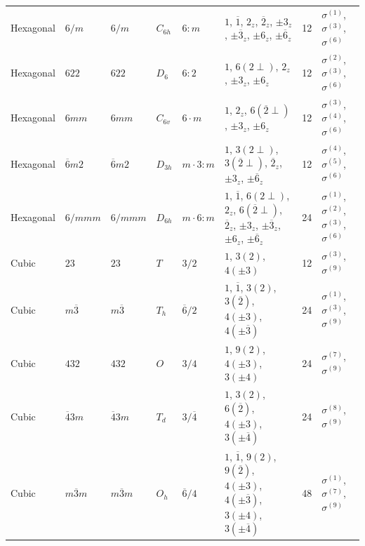 \documentclass[a4paper,11pt]{article}
\newcommand{\ob}[1]{\overline{#1}}
\newcommand{\sg}[1]{\sigma^{(#1)}}
\begin{document}
\begin{landscape}
\begin{longtable}{l l l l l p{9.5cm} r l}
Hexagonal & $6/m$ & $6/m$ & $C_{6h}$ & $6{:}m$ & $1$, $\ob{1}$, $2_z$, $\ob{2}_z$, $\pm 3_z$, $\pm\ob{3}_z$, $\pm 6_z$, $\pm\ob{6}_z$ & 12 & $\sg{1}$, $\sg{3}$, $\sg{6}$ \\
Hexagonal & $622$ & $622$ & $D_6$ & $6{:}2$ & $1$, $6(2{\perp})$, $2_z$, $\pm 3_z$, $\pm 6_z$ & 12 & $\sg{2}$, $\sg{3}$, $\sg{6}$ \\
Hexagonal & $6mm$ & $6mm$ & $C_{6v}$ & $6{\cdot}m$ & $1$, $2_z$, $6(\ob{2}{\perp})$, $\pm 3_z$, $\pm 6_z$ & 12 & $\sg{3}$, $\sg{4}$, $\sg{6}$ \\
Hexagonal & $\ob{6}m2$ & $\ob{6}m2$ & $D_{3h}$ & $m{\cdot}3{:}m$ & $1$, $3(2{\perp})$, $3(\ob{2}{\perp})$, $\ob{2}_z$, $\pm 3_z$, $\pm\ob{6}_z$ & 12 & $\sg{4}$, $\sg{5}$, $\sg{6}$ \\
Hexagonal & $6/mmm$ & $6/mmm$ & $D_{6h}$ & $m{\cdot}6{:}m$ & $1$, $\ob{1}$, $6(2{\perp})$, $2_z$, $6(\ob{2}{\perp})$, $\ob{2}_z$, $\pm 3_z$, $\pm\ob{3}_z$, $\pm 6_z$, $\pm\ob{6}_z$ & 24 & $\sg{1}$, $\sg{2}$, $\sg{3}$, $\sg{6}$ \\
\addlinespace
Cubic & $23$ & $23$ & $T$ & $3/2$ & $1$, $3(2)$, $4(\pm 3)$ & 12 & $\sg{3}$, $\sg{9}$ \\
Cubic & $m\ob{3}$ & $m\ob{3}$ & $T_h$ & $\ob{6}/2$ & $1$, $\ob{1}$, $3(2)$, $3(\ob{2})$, $4(\pm 3)$, $4(\pm\ob{3})$ & 24 & $\sg{1}$, $\sg{3}$, $\sg{9}$ \\
Cubic & $432$ & $432$ & $O$ & $3/4$ & $1$, $9(2)$, $4(\pm 3)$, $3(\pm 4)$ & 24 & $\sg{7}$, $\sg{9}$ \\
Cubic & $\ob{4}3m$ & $\ob{4}3m$ & $T_d$ & $3/\ob{4}$ & $1$, $3(2)$, $6(\ob{2})$, $4(\pm 3)$, $3(\pm\ob{4})$ & 24 & $\sg{8}$, $\sg{9}$ \\
Cubic & $m\ob{3}m$ & $m\ob{3}m$ & $O_h$ & $\ob{6}/4$ & $1$, $\ob{1}$, $9(2)$, $9(\ob{2})$, $4(\pm 3)$, $4(\pm\ob{3})$, $3(\pm 4)$, $3(\pm\ob{4})$ & 48 & $\sg{1}$, $\sg{7}$, $\sg{9}$ \\
\end{longtable}
\end{landscape}

\newpage
\end{document}
